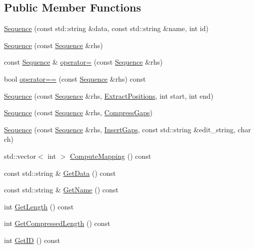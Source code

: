 \subsection*{Public Member Functions}
\begin{DoxyCompactItemize}
\item 
\hyperlink{class_c_o_n_t_r_a_l_i_g_n_1_1_sequence_a49f69736803f028dfb8140a75493ff05}{Sequence} (const std\+::string \&data, const std\+::string \&name, int id)
\item 
\hyperlink{class_c_o_n_t_r_a_l_i_g_n_1_1_sequence_a9cd3f8bd10d0b9b7fe326b12bc858d11}{Sequence} (const \hyperlink{class_c_o_n_t_r_a_l_i_g_n_1_1_sequence}{Sequence} \&rhs)
\item 
const \hyperlink{class_c_o_n_t_r_a_l_i_g_n_1_1_sequence}{Sequence} \& \hyperlink{class_c_o_n_t_r_a_l_i_g_n_1_1_sequence_a4b16387a3ed9439e7c3bdd6d412250eb}{operator=} (const \hyperlink{class_c_o_n_t_r_a_l_i_g_n_1_1_sequence}{Sequence} \&rhs)
\item 
bool \hyperlink{class_c_o_n_t_r_a_l_i_g_n_1_1_sequence_a14e7ddda906f3fc12bc642e18942f94c}{operator==} (const \hyperlink{class_c_o_n_t_r_a_l_i_g_n_1_1_sequence}{Sequence} \&rhs) const 
\item 
\hyperlink{class_c_o_n_t_r_a_l_i_g_n_1_1_sequence_aeae784d6fe0ae97b0fd202d3fc0f438b}{Sequence} (const \hyperlink{class_c_o_n_t_r_a_l_i_g_n_1_1_sequence}{Sequence} \&rhs, \hyperlink{class_c_o_n_t_r_a_l_i_g_n_1_1_sequence_a40ae43ad8766d4ec88647b6446f106f7}{Extract\+Positions}, int start, int end)
\item 
\hyperlink{class_c_o_n_t_r_a_l_i_g_n_1_1_sequence_ac3373914ac6c4550f9754846b2f537c5}{Sequence} (const \hyperlink{class_c_o_n_t_r_a_l_i_g_n_1_1_sequence}{Sequence} \&rhs, \hyperlink{class_c_o_n_t_r_a_l_i_g_n_1_1_sequence_ad5c978f10d584ae0e8460033964162c3}{Compress\+Gaps})
\item 
\hyperlink{class_c_o_n_t_r_a_l_i_g_n_1_1_sequence_a4161dcad0f05ac45b984a2a95a16e156}{Sequence} (const \hyperlink{class_c_o_n_t_r_a_l_i_g_n_1_1_sequence}{Sequence} \&rhs, \hyperlink{class_c_o_n_t_r_a_l_i_g_n_1_1_sequence_a707b9a9c2a068cbae9f2aaeb3a767e49}{Insert\+Gaps}, const std\+::string \&edit\+\_\+string, char ch)
\item 
std\+::vector$<$ int $>$ \hyperlink{class_c_o_n_t_r_a_l_i_g_n_1_1_sequence_a927027711f6a075617ce8075059a8898}{Compute\+Mapping} () const 
\item 
const std\+::string \& \hyperlink{class_c_o_n_t_r_a_l_i_g_n_1_1_sequence_ab809e307493a82f1de3538d88853ef9e}{Get\+Data} () const 
\item 
const std\+::string \& \hyperlink{class_c_o_n_t_r_a_l_i_g_n_1_1_sequence_a092a4fb1153cd7dd668b50e56f0c4462}{Get\+Name} () const 
\item 
int \hyperlink{class_c_o_n_t_r_a_l_i_g_n_1_1_sequence_ada35508c694b87e7203dfc1c3fece566}{Get\+Length} () const 
\item 
int \hyperlink{class_c_o_n_t_r_a_l_i_g_n_1_1_sequence_a0be09cffb4fd58dc5e48e307a4cdf1c6}{Get\+Compressed\+Length} () const 
\item 
int \hyperlink{class_c_o_n_t_r_a_l_i_g_n_1_1_sequence_a72af77b3cb5126e7c399366dcc19401a}{Get\+I\+D} () const 
\end{DoxyCompactItemize}
